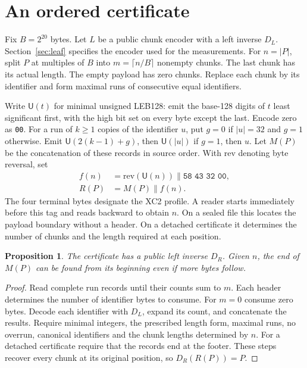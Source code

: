 \documentclass[10pt,twocolumn,letterpaper]{article}
\newtheorem{proposition}[theorem]{Proposition}
\newcommand{\cat}{\mathbin{\|}}
\newcommand{\byte}[1]{\texttt{#1}}
\newcommand{\len}[1]{\lvert #1\rvert}
\newcommand{\U}{\mathsf{U}}
\begin{document}
\section{An ordered certificate}
Fix \(B=2^{20}\) bytes. Let \(L\) be a public chunk encoder with a left inverse \(D_L\). Section~\ref{sec:leaf} specifies the encoder used for the measurements. For \(n=\len{P}\), split \(P\) at multiples of \(B\) into \(m=\lceil n/B\rceil\) nonempty chunks. The last chunk has its actual length. The empty payload has zero chunks. Replace each chunk by its identifier and form maximal runs of consecutive equal identifiers.

Write \(\U(t)\) for minimal unsigned LEB128: emit the base-128 digits of \(t\) least significant first, with the high bit set on every byte except the last. Encode zero as \byte{00}. For a run of \(k\geq1\) copies of the identifier \(u\), put \(g=0\) if \(\len{u}=32\) and \(g=1\) otherwise. Emit \(\U(2(k-1)+g)\), then \(\U(\len{u})\) if \(g=1\), then \(u\). Let \(M(P)\) be the concatenation of these records in source order. With \(\mathrm{rev}\) denoting byte reversal, set
\begin{align}
 f(n)&=\mathrm{rev}(\U(n))\cat\byte{58 43 32 00},\\
 R(P)&=M(P)\cat f(n). \label{eq:root}
\end{align}
The four terminal bytes designate the XC2 profile. A reader starts immediately before this tag and reads backward to obtain \(n\). On a sealed file this locates the payload boundary without a header. On a detached certificate it determines the number of chunks and the length required at each position.

\begin{proposition}\label{prop:decode}
The certificate has a public left inverse \(D_R\). Given \(n\), the end of \(M(P)\) can be found from its beginning even if more bytes follow.
\end{proposition}
\begin{proof}
Read complete run records until their counts sum to \(m\). Each header determines the number of identifier bytes to consume. For \(m=0\) consume zero bytes. Decode each identifier with \(D_L\), expand its count, and concatenate the results. Require minimal integers, the prescribed length form, maximal runs, no overrun, canonical identifiers and the chunk lengths determined by \(n\). For a detached certificate require that the records end at the footer. These steps recover every chunk at its original position, so \(D_R(R(P))=P\).
\end{proof}
\end{document}
